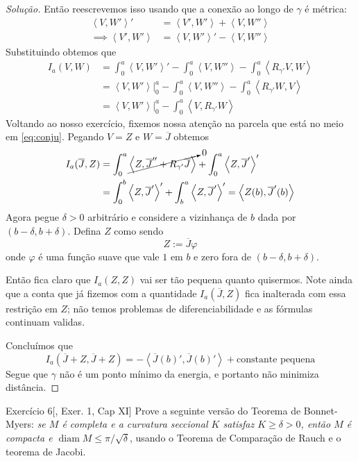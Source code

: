 \begin{proof}[Solução]
Então reescrevemos isso usando que a conexão ao longo de \(\gamma\) é métrica:
\begin{align*}
\left<V,W'\right>'&=\left<V',W'\right>+\left<V,W''\right>\\
\implies  \left<V',W'\right>&=\left<V,W'\right>'- \left<V,W''\right>
\end{align*}
Substituindo obtemos que
\begin{align*}
I_a(V,W)&=\int_0^a\left<V,W'\right>'-\int_0^a \left<V,W''\right>-\int_0^a \left<R_{\gamma'}V,W\right>\\
&=\left<V,W'\right>|_{0}^a-\int_0^a \left<V,W''\right>-\int_0^a\left<R_{\gamma'}W,V\right>\\
&=\left<V,W'\right>|_{0}^a-\int_0^a \left<V,R_{\gamma'}W\right>
\end{align*}
Voltando ao nosso exercício, fixemos nossa atenção na parcela que está no meio em \cref{eq:conju}. Pegando \(V=Z\) e \(W=\overline{J}\) obtemos
\begin{align*}
I_a(\overline{J},Z)&=\int_0^a \cancelto{0}{\left< Z, \overline{J}'' + R_{\gamma'}\overline{J}\right>}+\int_0^a \left<Z,\overline{J}'\right>'\\&=\int_0^b\left<Z,\overline{J}'\right>'+\int_b^a \left< Z,\overline{J}'\right>'=\left<Z(b),\overline{J}'(b)\right>
\end{align*}
Agora pegue \(\delta>0\) arbitrário e considere a vizinhança de \(b\) dada por \((b-\delta,b+\delta)\). Defina \(Z\) como sendo \[Z:=\overline{J} \varphi\] onde \(\varphi\) é uma função suave que vale \(1\) em \(b\) e zero fora de \((b-\delta,b+\delta)\).

Então fica claro que \(I_a(Z,Z)\) vai ser tão pequena quanto quisermos. Note ainda que a conta que já fizemos com a quantidade  \(I_a(\overline{J},Z)\) fica inalterada com essa restrição em \(Z\); não temos problemas de diferenciabilidade e as fórmulas continuam validas.

Concluímos que
\[I_a(\overline{J}+Z,\overline{J}+Z)=-\left<\overline{J}(b)',\overline{J}(b)'\right>+\text{constante pequena} \]
Segue que \(\gamma\) não é um ponto mínimo da energia, e portanto não minimiza distância.
\end{proof}

\begin{thing6}{Exercício 6}[\cite{doc}, Exer. 1, Cap XI]\label{exer:6}\leavevmode
Prove a seguinte versão do Teorema de Bonnet-Myers: \textit{se \(M\) é completa e a curvatura seccional \(K\) satisfaz \(K \geq  \delta>0\), então \(M\) é compacta e \(\operatorname{diam}M \leq \pi/\sqrt{\delta}\)}, usando o Teorema de Comparação de Rauch e o teorema de Jacobi.
\end{thing6}

